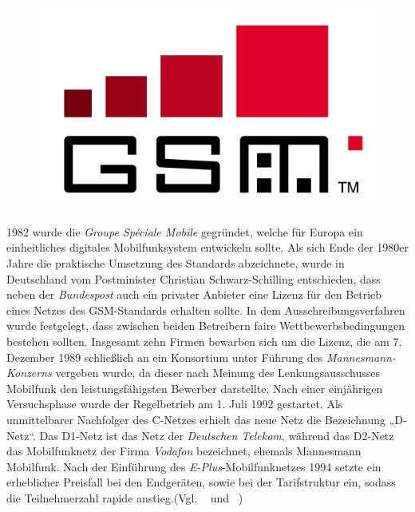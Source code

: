 \begin{multicols}{3}


\begin{figure}
  \vspace{-1pt}
  \begin{center}
  	\hspace{-20pt}
    \includegraphics[width=0.7\linewidth]{Kapitel/DNetz/Grafiken/gsm_logo.png}
  \end{center}
  \vspace{-10pt}
\end{figure}
1982 wurde die \textit{Groupe Spéciale Mobile} gegründet, welche für Europa ein einheitliches digitales Mobilfunksystem entwickeln sollte. Als sich Ende der 1980er Jahre die praktische Umsetzung des Standards abzeichnete, wurde in Deutschland vom Postminister Christian Schwarz-Schilling entschieden, dass neben der \textit{Bundespost} auch ein privater Anbieter eine Lizenz für den Betrieb eines Netzes des GSM-Standards erhalten sollte. In dem Ausschreibungsverfahren wurde festgelegt, dass zwischen beiden Betreibern faire Wettbewerbsbedingungen bestehen sollten. Insgesamt zehn Firmen bewarben sich um die Lizenz, die am 7. Dezember 1989 schließlich an ein Konsortium unter Führung des \textit{Mannesmann-Konzerns} vergeben wurde, da dieser nach Meinung des Lenkungsausschusses Mobilfunk den leistungsfähigsten Bewerber darstellte.
Nach einer einjährigen Versuchsphase wurde der Regelbetrieb am 1. Juli 1992 gestartet. Als unmittelbarer Nachfolger des C-Netzes erhielt das neue Netz die Bezeichnung „D-Netz“.
Das D1-Netz ist das Netz der \textit{Deutschen Telekom}, während das D2-Netz das Mobilfunknetz der Firma \textit{Vodafon} bezeichnet, ehemals Mannesmann Mobilfunk. Nach der Einführung des \textit{E-Plus}-Mobilfunknetzes 1994 setzte ein erheblicher Preisfall bei den Endgeräten, sowie bei der Tarifstruktur ein, sodass die Teilnehmerzahl rapide anstieg.(Vgl. ~\cite{DNetz.3} und ~\cite{DNetz.4})





\end{multicols}
